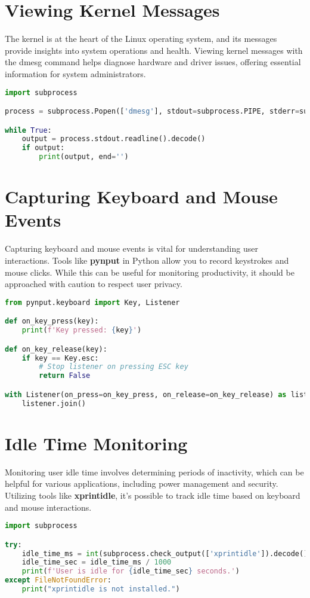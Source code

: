 \documentclass{VUMIFPSmagistrinis}
\begin{document}
\section{Viewing Kernel Messages}
The kernel is at the heart of the Linux operating system, and its messages provide insights into system operations and health. Viewing kernel messages with the dmesg command helps diagnose hardware and driver issues, offering essential information for system administrators.
\begin{lstlisting}[language=Python]
import subprocess

process = subprocess.Popen(['dmesg'], stdout=subprocess.PIPE, stderr=subprocess.PIPE)

while True:
    output = process.stdout.readline().decode()
    if output:
        print(output, end='')
\end{lstlisting}

\section{Capturing Keyboard and Mouse Events}
Capturing keyboard and mouse events is vital for understanding user interactions. Tools like \textbf{pynput} in Python allow you to record keystrokes and mouse clicks. While this can be useful for monitoring productivity, it should be approached with caution to respect user privacy.

\begin{lstlisting}[language=Python]
from pynput.keyboard import Key, Listener

def on_key_press(key):
    print(f'Key pressed: {key}')

def on_key_release(key):
    if key == Key.esc:
        # Stop listener on pressing ESC key
        return False

with Listener(on_press=on_key_press, on_release=on_key_release) as listener:
    listener.join()
\end{lstlisting}

\section{Idle Time Monitoring}
Monitoring user idle time involves determining periods of inactivity, which can be helpful for various applications, including power management and security. Utilizing tools like \textbf{xprintidle}, it's possible to track idle time based on keyboard and mouse interactions.

\begin{lstlisting}[language=Python]
import subprocess

try:
    idle_time_ms = int(subprocess.check_output(['xprintidle']).decode())
    idle_time_sec = idle_time_ms / 1000
    print(f'User is idle for {idle_time_sec} seconds.')
except FileNotFoundError:
    print("xprintidle is not installed.")
\end{lstlisting}
\end{document}
